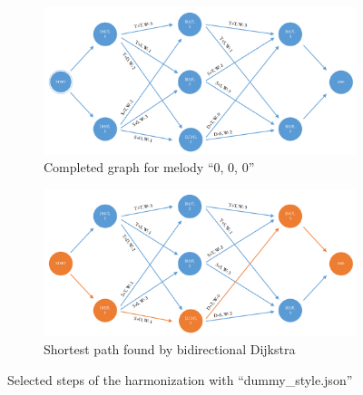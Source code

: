 \begin{figure}
\begin{subfigure}[b]{0.70\textwidth}
   \includegraphics[width=\linewidth]{Chapters/pic/43}
   \caption{Completed graph for melody ``0, 0, 0''}
   \label{fig:43}
\end{subfigure}

\begin{subfigure}[b]{0.70\textwidth}
   \includegraphics[width=\linewidth]{Chapters/pic/44}
   \caption{Shortest path found by bidirectional Dijkstra}
   \label{fig:44}
\end{subfigure}

\caption{Selected steps of the harmonization with ``dummy\_style.json''}
\label{fig:4}
\end{figure}

